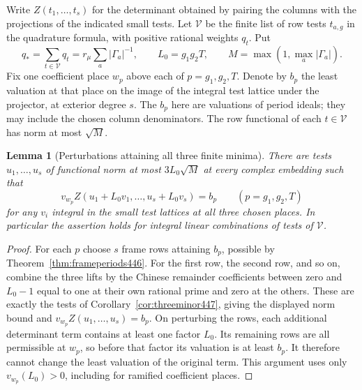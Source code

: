 \documentclass[a4paper,11pt]{article}
\newtheorem{lemma}[proposition]{Lemma}
\theoremstyle{definition}
\theoremstyle{remark}
\numberwithin{equation}{section}
\begin{document}
Write \(Z(t_1,\ldots,t_s)\) for the determinant obtained by
pairing the columns with the projections of the indicated small
tests. Let \(\mathcal V\) be the finite list of row tests
\(t_{a,g}\) in the quadrature formula, with positive rational
weights \(q_t\). Put
\[
 q_*=\sum_{t\in\mathcal V}q_t
     =r_\mu\sum_a|\Gamma_a|^{-1},\qquad
 L_0=g_1g_2T,\qquad M=\max(1,\max_a|\Gamma_a|).
\]
Fix one coefficient place \(w_p\) above each of \(p=g_1,g_2,T\).
Denote by \(b_p\) the least valuation at that place on the image
of the integral test lattice under the projector, at exterior
degree \(s\). The \(b_p\) here are valuations of period ideals;
they may include the chosen column denominators. The row functional
of each \(t\in\mathcal V\) has norm at most \(\sqrt M\).

\begin{lemma}[Perturbations attaining all three finite minima]\leavevmode
\label{lem:markedperturb477}
There are tests \(u_1,\ldots,u_s\) of functional norm at most
\(3L_0\sqrt M\) at every complex embedding such that
\[
          v_{w_p} Z(u_1+L_0v_1,\ldots,u_s+L_0v_s)=b_p
                   \qquad(p=g_1,g_2,T)
\]
for any \(v_i\) integral in the small test lattices at all three
chosen places. In particular the assertion holds for integral
linear combinations of tests of \(\mathcal V\).
\end{lemma}
\begin{proof}
For each \(p\) choose \(s\) frame rows attaining \(b_p\), possible
by Theorem~\ref{thm:frameperiods446}. For the first row, the second
row, and so on, combine the three lifts by the Chinese remainder
coefficients between zero and \(L_0-1\) equal to one at their
own rational prime and zero at the others. These are exactly the
tests of Corollary~\ref{cor:threeminor447}, giving the displayed
norm bound and \(v_{w_p}Z(u_1,\ldots,u_s)=b_p\). On perturbing
the rows, each additional determinant term contains at least one
factor \(L_0\). Its remaining rows are all permissible at \(w_p\),
so before that factor its valuation is at least \(b_p\).
It therefore cannot change the least valuation of the original
term. This argument uses only \(v_{w_p}(L_0)>0\), including for
ramified coefficient places.
\end{proof}
\end{document}
